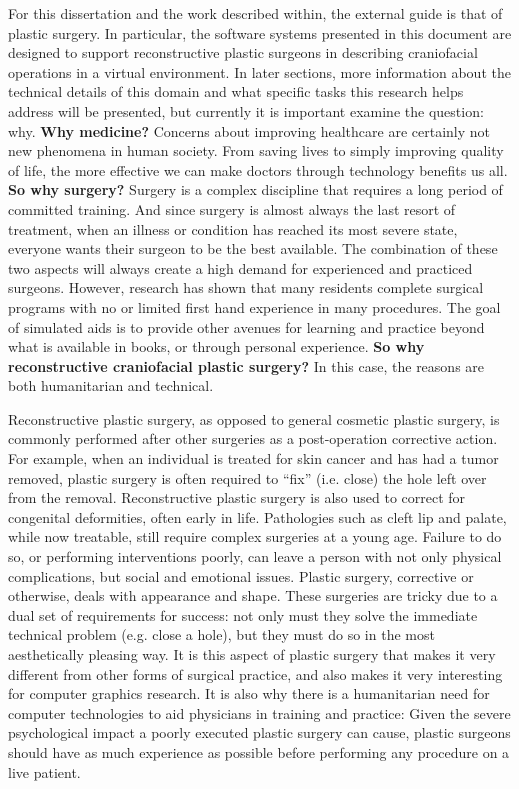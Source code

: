 \documentclass[12pt,oneside,letterpaper]{memoir}
\begin{document}
For this dissertation and the work described within, the external
guide is that of plastic surgery. In particular, the software systems
presented in this document are designed to support reconstructive
plastic surgeons in describing craniofacial operations in a virtual
environment. In later sections, more information about the technical
details of this domain and what specific tasks this research helps
address will be presented, but currently it is important examine the
question: why. \textbf{Why medicine?} Concerns about improving healthcare are
certainly not new phenomena in human society. From saving lives to
simply improving quality of life, the more effective we can make
doctors through technology benefits us all. \textbf{So why surgery?} Surgery is
a complex discipline that requires a long period of committed
training\cite{Chung:2005}. And since surgery is almost always the last resort of
treatment, when an illness or condition has reached its most severe
state, everyone wants their surgeon to be the best available. The
combination of these two aspects will always create a high demand for
experienced and practiced surgeons. However, research has shown that
many residents complete surgical programs with no or limited first
hand experience in many procedures\cite{BellBTRCBL:2009}. The goal of
simulated aids is to provide other avenues for learning and practice beyond
what is available in books, or through personal experience.\textbf{ So why
reconstructive craniofacial plastic surgery?} In this case, the reasons are both
humanitarian and technical.

Reconstructive plastic surgery, as opposed to general cosmetic plastic
surgery, is commonly performed after other surgeries as a
post-operation corrective action. For example, when an individual is
treated for skin cancer and has had a tumor removed, plastic surgery
is often required to ``fix'' (i.e. close) the hole left over from the
removal. Reconstructive plastic surgery is also used to correct for
congenital deformities, often early in life. Pathologies such as cleft
lip and palate, while now treatable, still require complex surgeries at a
young age. Failure to do so, or performing interventions poorly, can
leave a person with not only physical complications, but social and
emotional issues. Plastic surgery, corrective or otherwise, deals with
appearance and shape. These surgeries are tricky due to a dual set of
requirements for success: not only must they solve the immediate
technical problem (e.g. close a hole), but they must do so in the most
aesthetically pleasing way. It is this aspect of plastic surgery that makes it
very different from other forms of surgical practice, and also makes
it very interesting for computer graphics research. It is also why
there is a humanitarian need for computer technologies to aid
physicians in training and practice: Given the severe psychological
impact a poorly executed plastic surgery can cause, plastic surgeons
should have as much experience as possible before performing any procedure
on a live patient.
\end{document}
